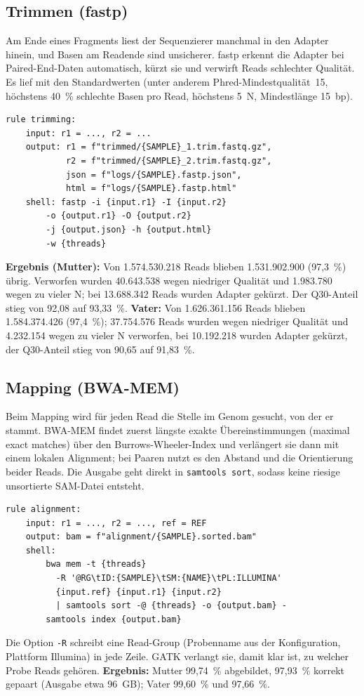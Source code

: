 \documentclass[10pt,a4paper,twocolumn]{article}
\begin{document}
\subsection{Trimmen (fastp)}
Am Ende eines Fragments liest der Sequenzierer manchmal in den Adapter hinein, und Basen am Readende sind unsicherer. fastp \citep{chen2018} erkennt die Adapter bei Paired-End-Daten automatisch, kürzt sie und verwirft Reads schlechter Qualität. Es lief mit den Standardwerten (unter anderem Phred-Mindestqualität~15, höchstens 40~\% schlechte Basen pro Read, höchstens 5~N, Mindestlänge 15~bp).
\begin{lstlisting}
rule trimming:
    input: r1 = ..., r2 = ...
    output: r1 = f"trimmed/{SAMPLE}_1.trim.fastq.gz",
            r2 = f"trimmed/{SAMPLE}_2.trim.fastq.gz",
            json = f"logs/{SAMPLE}.fastp.json",
            html = f"logs/{SAMPLE}.fastp.html"
    shell: fastp -i {input.r1} -I {input.r2}
        -o {output.r1} -O {output.r2}
        -j {output.json} -h {output.html}
        -w {threads}
\end{lstlisting}
\textbf{Ergebnis (Mutter):} Von 1.574.530.218 Reads blieben 1.531.902.900 (97,3~\%) übrig. Verworfen wurden 40.643.538 wegen niedriger Qualität und 1.983.780 wegen zu vieler N; bei 13.688.342 Reads wurden Adapter gekürzt. Der Q30-Anteil stieg von 92,08 auf 93,33~\%. \textbf{Vater:} Von 1.626.361.156 Reads blieben 1.584.374.426 (97,4~\%); 37.754.576 Reads wurden wegen niedriger Qualität und 4.232.154 wegen zu vieler N verworfen, bei 10.192.218 wurden Adapter gekürzt, der Q30-Anteil stieg von 90,65 auf 91,83~\%.
 
\subsection{Mapping (BWA-MEM)}
Beim Mapping wird für jeden Read die Stelle im Genom gesucht, von der er stammt. BWA-MEM \citep{li2013} findet zuerst längste exakte Übereinstimmungen (\glqq maximal exact matches\grqq) über den Burrows-Wheeler-Index und verlängert sie dann mit einem lokalen Alignment; bei Paaren nutzt es den Abstand und die Orientierung beider Reads. Die Ausgabe geht direkt in \texttt{samtools sort}, sodass keine riesige unsortierte SAM-Datei entsteht.
\begin{lstlisting}
rule alignment:
    input: r1 = ..., r2 = ..., ref = REF
    output: bam = f"alignment/{SAMPLE}.sorted.bam"
    shell:
        bwa mem -t {threads}
          -R '@RG\tID:{SAMPLE}\tSM:{NAME}\tPL:ILLUMINA'
          {input.ref} {input.r1} {input.r2}
          | samtools sort -@ {threads} -o {output.bam} -
        samtools index {output.bam}
\end{lstlisting}
Die Option \texttt{-R} schreibt eine Read-Group (Probenname aus der Konfiguration, Plattform Illumina) in jede Zeile. GATK verlangt sie, damit klar ist, zu welcher Probe Reads gehören. \textbf{Ergebnis:} Mutter 99,74~\% abgebildet, 97,93~\% korrekt gepaart (Ausgabe etwa 96~GB); Vater 99,60~\% und 97,66~\%.
 
\end{document}

